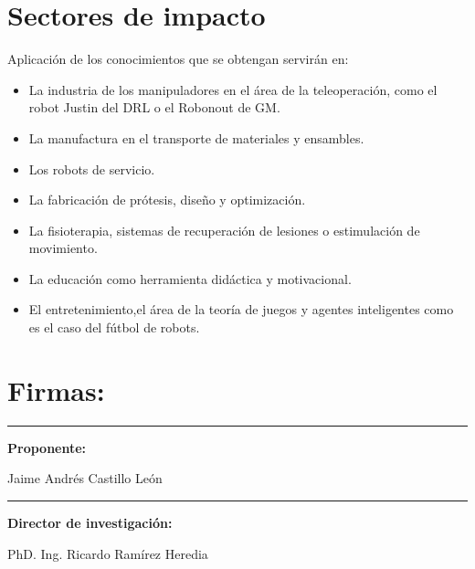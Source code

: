 \documentclass[12pt,twoside,onecolumn,letterpaper]{article}
\begin{document}
\section{Sectores de impacto}
\label{sec:impacto}
Aplicaci\'on de los conocimientos que se obtengan servir\'an en: 
\begin{itemize}
\item La industria de los manipuladores en el \'area de la teleoperaci\'on, como el robot Justin del DRL o el Robonout de GM.
\item La manufactura en el transporte de materiales y ensambles.
\item Los robots de servicio.
\item La fabricaci\'on de prótesis, dise\~no y optimizaci\'on.
\item La fisioterapia, sistemas de recuperaci\'on de lesiones o estimulaci\'on de movimiento.
\item La educaci\'on como herramienta did\'actica y motivacional.
\item El entretenimiento,el área de la teor\'ia de juegos y agentes inteligentes como es el caso del fútbol de robots.
\end{itemize}



\vspace{2cm}

\section*{Firmas:}
\label{firmas}
\vspace{4cm}
\parbox[b][3cm][c]{8cm}{
\centering
\rule{7cm}{1pt}\par
\textbf{Proponente:}\par
Jaime Andr\'es Castillo Le\'on
}\par\vspace{3cm}
\parbox[b][3cm][c]{8cm}{
\centering
\rule{7cm}{1pt}\par
\textbf{Director de investigaci\'on:}\par
PhD. Ing. Ricardo Ram\'irez Heredia
}
\end{document}
